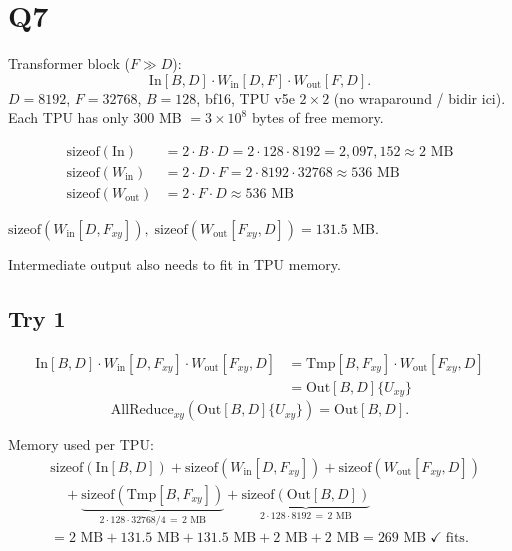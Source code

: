 \documentclass[11pt]{article}
\begin{document}
\section*{Q7}

Transformer block ($F \gg D$):
\[
\text{In}[B, D] \cdot W_{\text{in}}[D, F] \cdot W_{\text{out}}[F, D].
\]
$D = 8192$, $F = 32768$, $B = 128$, bf16, TPU v5e $2 \times 2$ (no wraparound / bidir ici).
Each TPU has only $300$ MB $= 3 \times 10^8$ bytes of free memory.

\begin{align*}
\text{sizeof}(\text{In}) &= 2 \cdot B \cdot D = 2 \cdot 128 \cdot 8192 = 2{,}097{,}152 \approx 2 \text{ MB} \\
\text{sizeof}(W_{\text{in}}) &= 2 \cdot D \cdot F = 2 \cdot 8192 \cdot 32768 \approx 536 \text{ MB} \\
\text{sizeof}(W_{\text{out}}) &= 2 \cdot F \cdot D \approx 536 \text{ MB}
\end{align*}

$\text{sizeof}(W_{\text{in}}[D, F_{xy}]),\; \text{sizeof}(W_{\text{out}}[F_{xy}, D]) = 131.5$ MB.

Intermediate output also needs to fit in TPU memory.

\subsection*{Try 1}

\begin{align*}
\text{In}[B, D] \cdot W_{\text{in}}[D, F_{xy}] \cdot W_{\text{out}}[F_{xy}, D]
&= \text{Tmp}[B, F_{xy}] \cdot W_{\text{out}}[F_{xy}, D] \\
&= \text{Out}[B, D]\{U_{xy}\}
\end{align*}
\[
\text{AllReduce}_{xy}(\text{Out}[B, D]\{U_{xy}\}) = \text{Out}[B, D].
\]

Memory used per TPU:
\begin{align*}
&\text{sizeof}(\text{In}[B, D]) + \text{sizeof}(W_{\text{in}}[D, F_{xy}]) + \text{sizeof}(W_{\text{out}}[F_{xy}, D]) \\
&\quad + \underbrace{\text{sizeof}(\text{Tmp}[B, F_{xy}])}_{2 \cdot 128 \cdot 32768/4 \,=\, 2 \text{ MB}}
+ \underbrace{\text{sizeof}(\text{Out}[B, D])}_{2 \cdot 128 \cdot 8192 \,=\, 2 \text{ MB}} \\
&= 2\text{ MB} + 131.5\text{ MB} + 131.5\text{ MB} + 2\text{ MB} + 2\text{ MB} = 269\text{ MB} \;\checkmark\; \text{fits}.
\end{align*}
\end{document}
